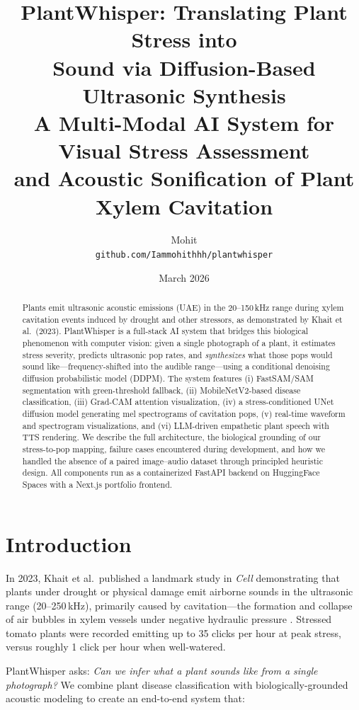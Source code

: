 \documentclass[11pt,a4paper,twocolumn]{article}
\title{
    \vspace{-1cm}
    {\LARGE\bfseries PlantWhisper: Translating Plant Stress into\\Sound via Diffusion-Based Ultrasonic Synthesis}\\[0.5em]
    {\large A Multi-Modal AI System for Visual Stress Assessment\\and Acoustic Sonification of Plant Xylem Cavitation}
}
\author{
    Mohit \\
    \texttt{github.com/Iammohithhh/plantwhisper}
}
\date{March 2026}
\begin{document}
\maketitle

\begin{abstract}
Plants emit ultrasonic acoustic emissions (UAE) in the 20--150\,kHz range during xylem cavitation events induced by drought and other stressors, as demonstrated by Khait et al.\ (2023). PlantWhisper is a full-stack AI system that bridges this biological phenomenon with computer vision: given a single photograph of a plant, it estimates stress severity, predicts ultrasonic pop rates, and \emph{synthesizes} what those pops would sound like---frequency-shifted into the audible range---using a conditional denoising diffusion probabilistic model (DDPM). The system features (i) FastSAM/SAM segmentation with green-threshold fallback, (ii) MobileNetV2-based disease classification, (iii) Grad-CAM attention visualization, (iv) a stress-conditioned UNet diffusion model generating mel spectrograms of cavitation pops, (v) real-time waveform and spectrogram visualizations, and (vi) LLM-driven empathetic plant speech with TTS rendering. We describe the full architecture, the biological grounding of our stress-to-pop mapping, failure cases encountered during development, and how we handled the absence of a paired image--audio dataset through principled heuristic design. All components run as a containerized FastAPI backend on HuggingFace Spaces with a Next.js portfolio frontend.
\end{abstract}

\section{Introduction}

In 2023, Khait et al.\ published a landmark study in \emph{Cell} demonstrating that plants under drought or physical damage emit airborne sounds in the ultrasonic range (20--250\,kHz), primarily caused by cavitation---the formation and collapse of air bubbles in xylem vessels under negative hydraulic pressure \cite{khait2023}. Stressed tomato plants were recorded emitting up to 35 clicks per hour at peak stress, versus roughly 1 click per hour when well-watered.

PlantWhisper asks: \emph{Can we infer what a plant sounds like from a single photograph?} We combine plant disease classification with biologically-grounded acoustic modeling to create an end-to-end system that:
\end{document}
